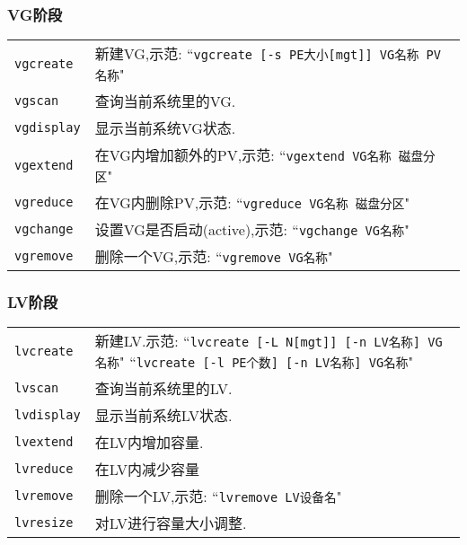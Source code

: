 \subsubsection{VG阶段}
\begin{longtable}{l@{ : }p{}}\hline\hline

    \texttt{vgcreate} & 新建VG,示范:\newline
        ``\verb"vgcreate [-s PE大小[mgt]] VG名称 PV名称""\\

    \texttt{vgscan} & 查询当前系统里的VG.\\

    \texttt{vgdisplay} & 显示当前系统VG状态.\\

    \texttt{vgextend} & 在VG内增加额外的PV,示范:\newline
        ``\verb"vgextend VG名称 磁盘分区""\\

    \texttt{vgreduce} & 在VG内删除PV,示范:\newline
        ``\verb"vgreduce VG名称 磁盘分区""\\

    \texttt{vgchange} & 设置VG是否启动(active),示范:\newline
        ``\verb"vgchange VG名称""\\

    \texttt{vgremove} & 删除一个VG,示范:\newline
        ``\verb"vgremove VG名称""\\

    \hline
\end{longtable}

\subsubsection{LV阶段}
\begin{longtable}{l@{ : }p{}}\hline\hline

    \texttt{lvcreate} & 新建LV.示范:\newline
        ``\verb"lvcreate [-L N[mgt]] [-n LV名称] VG名称""\newline
        ``\verb"lvcreate [-l PE个数] [-n LV名称] VG名称""\\

    \texttt{lvscan} & 查询当前系统里的LV.\\

    \texttt{lvdisplay} & 显示当前系统LV状态.\\

    \texttt{lvextend} & 在LV内增加容量.\\

    \texttt{lvreduce} & 在LV内减少容量\\

    \texttt{lvremove} & 删除一个LV,示范:\newline
        ``\verb"lvremove LV设备名""\\

    \texttt{lvresize} & 对LV进行容量大小调整.\\

    \hline
\end{longtable}

